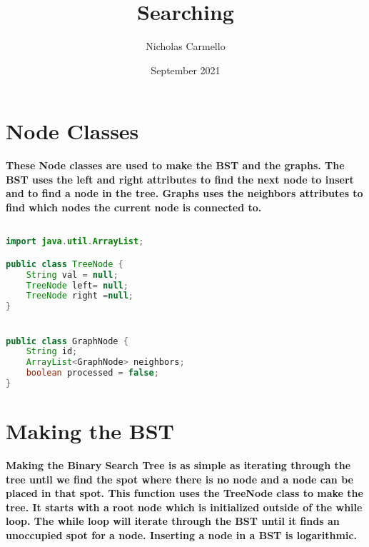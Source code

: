 \documentclass{article}
\begin{document}
\title{Searching}
\author{Nicholas Carmello}
\date{September 2021}
\section{Node Classes}
\textbf{These Node classes are used to make the BST and the graphs. The BST uses the left and right attributes to find the next node to insert and to find a node in the tree. Graphs uses the neighbors attributes to find which nodes the current node is connected to.}
\begin{lstlisting}[language = java]

import java.util.ArrayList;

public class TreeNode {
    String val = null;
    TreeNode left= null;
    TreeNode right =null;
}


public class GraphNode {
    String id;
    ArrayList<GraphNode> neighbors;
    boolean processed = false; 
}

\end{lstlisting}
\section{Making the BST}

\textbf{Making the Binary Search Tree is as simple as iterating through the tree until we find the spot where there is no node and a node can be placed in that spot. This function uses the TreeNode class to make the tree. It starts with a root node which is initialized outside of the while loop. The while loop will iterate through the BST until it finds an unoccupied spot for a node. Inserting a node in a BST is logarithmic.}
\end{document}
